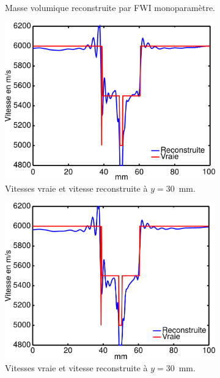 \begin{figure}[p]
\begin{changemargin}{-2cm}{-2cm}
\begin{subfigure}[b]{0.29\textwidth}
			\caption{Masse volumique reconstruite par FWI monoparamètre.}
		\end{subfigure}
		\begin{subfigure}[b]{0.29\textwidth}
			\includegraphics[width=\textwidth]{img/mono_param/coupe_vp_mono_uni_hor.png}
			\caption{Vitesses vraie et vitesse reconstruite à $y=30$~mm.}
		\end{subfigure}
		\begin{subfigure}[b]{0.29\textwidth}
			\includegraphics[width=\textwidth]{img/mono_param/coupe_vp_mono_smooth_hor.png}
			\caption{Vitesses vraie et vitesse reconstruite à $y=30$~mm.}
		\end{subfigure}
		\begin{subfigure}[b]{0.29\textwidth}

\end{subfigure}
\end{changemargin}
\end{figure}
